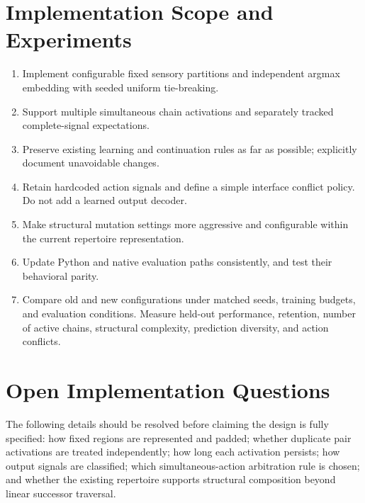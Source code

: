 \documentclass[11pt]{article}
\begin{document}
\section{Implementation Scope and Experiments}
\begin{enumerate}[leftmargin=*]
\item Implement configurable fixed sensory partitions and independent argmax embedding with seeded uniform tie-breaking.
\item Support multiple simultaneous chain activations and separately tracked complete-signal expectations.
\item Preserve existing learning and continuation rules as far as possible; explicitly document unavoidable changes.
\item Retain hardcoded action signals and define a simple interface conflict policy. Do not add a learned output decoder.
\item Make structural mutation settings more aggressive and configurable within the current repertoire representation.
\item Update Python and native evaluation paths consistently, and test their behavioral parity.
\item Compare old and new configurations under matched seeds, training budgets, and evaluation conditions. Measure held-out performance, retention, number of active chains, structural complexity, prediction diversity, and action conflicts.
\end{enumerate}

\section{Open Implementation Questions}
The following details should be resolved before claiming the design is fully specified: how fixed regions are represented and padded; whether duplicate pair activations are treated independently; how long each activation persists; how output signals are classified; which simultaneous-action arbitration rule is chosen; and whether the existing repertoire supports structural composition beyond linear successor traversal.
\end{document}
